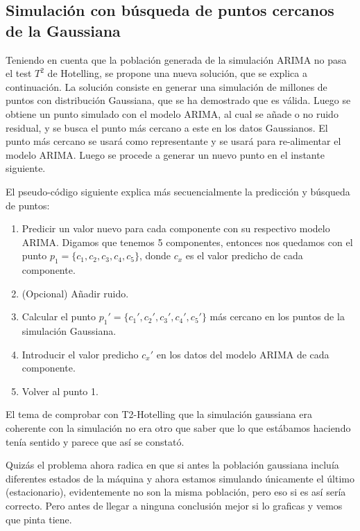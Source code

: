 \documentclass[11pt,spanish,listoffigures,listoftables]{tfgetsinf}
\begin{document}
        \subsection{Simulación con búsqueda de puntos cercanos de la Gaussiana}
        Teniendo en cuenta que la población generada de la simulación ARIMA no pasa el test \(T^2\) de Hotelling, se propone una nueva solución, que se explica a continuación. La solución consiste en generar una simulación de millones de puntos con distribución Gaussiana, que se ha demostrado que es válida. Luego se obtiene un punto simulado con el modelo ARIMA, al cual se añade o no ruido residual, y se busca el punto más cercano a este en los datos Gaussianos. El punto más cercano se usará como representante y se usará para re-alimentar el modelo ARIMA. Luego se procede a generar un nuevo punto en el instante siguiente.
        
        El pseudo-código siguiente explica más secuencialmente la predicción y búsqueda de puntos: 
        \begin{enumerate}
        \item Predicir un valor nuevo para cada componente con su respectivo modelo ARIMA. Digamos que tenemos 5 componentes, entonces nos quedamos con el punto \(p_{1} = \{c_{1}, c_{2}, c_{3}, c_{4}, c_{5}\}\), donde \(c_{x}\) es el valor predicho de cada componente.
        \item (Opcional) Añadir ruido.
        \item Calcular el punto \(p_{1}' = \{c_{1}', c_{2}', c_{3}', c_{4}', c_{5}'\}\) más cercano en los puntos de la simulación Gaussiana.
        \item Introducir el valor predicho \(c_{x}'\) en los datos del modelo ARIMA de cada componente.
        \item Volver al punto 1.
        \end{enumerate}

El tema de comprobar con T2-Hotelling que la simulación gaussiana era coherente con la simulación no era otro que saber que lo que estábamos haciendo tenía sentido y parece que así se constató.

Quizás el problema ahora radica en que si antes la población gaussiana incluía diferentes estados de la máquina y ahora estamos simulando únicamente el último (estacionario), evidentemente no son la misma población, pero eso si es así sería correcto. Pero antes de llegar a ninguna conclusión mejor si lo graficas y vemos que pinta tiene.        
        
\end{document}
